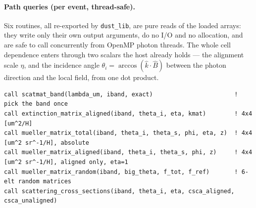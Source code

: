 \documentclass{my_memo}
\newcommand{\code}[1]{\texttt{#1}}
\begin{document}
\paragraph{Path queries (per event, thread-safe).} Six routines, all re-exported
by \code{dust\_lib}, are pure reads of the loaded arrays: they write only their own
output arguments, do no I/O and no allocation, and are safe to call concurrently
from OpenMP photon threads. The whole cell dependence enters through two scalars
the host already holds --- the alignment scale $\eta$, and the incidence angle
$\theta_i = \arccos(\hat k\!\cdot\!\hat B)$ between the photon direction and the
local field, from one dot product.
\begin{lstlisting}
call scatmat_band(lambda_um, iband, exact)                       ! pick the band once
call extinction_matrix_aligned(iband, theta_i, eta, kmat)        ! 4x4  [um^2/H]
call mueller_matrix_total(iband, theta_i, theta_s, phi, eta, z)  ! 4x4  [um^2 sr^-1/H], absolute
call mueller_matrix_aligned(iband, theta_i, theta_s, phi, z)     ! 4x4  [um^2 sr^-1/H], aligned only, eta=1
call mueller_matrix_random(iband, big_theta, f_tot, f_ref)       ! 6-elt random matrices
call scattering_cross_sections(iband, theta_i, eta, csca_aligned, csca_unaligned)
\end{lstlisting}
\end{document}
